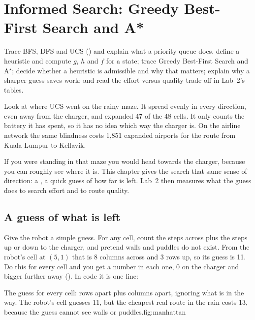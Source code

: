 \chapter{Informed Search: Greedy Best-First Search and A*}
\label{ch:informed}

\chapterguide%
  {Trace BFS, DFS and UCS () and explain what a priority queue does.}
  {define a heuristic and compute $g$, $h$ and $f$ for a state; trace Greedy Best-First Search and A$^\star$; decide whether a heuristic is admissible and why that matters; explain why a sharper guess saves work; and read the effort-versus-quality trade-off in Lab~2's tables.}

Look at where UCS went on the rainy maze. It spread evenly in every direction, even away from the charger, and expanded 47 of the 48 cells. It only counts the battery it has spent, so it has no idea which way the charger is. On the airline network the same blindness costs 1,851 expanded airports for the route from Kuala Lumpur to Keflav\'ik.

If you were standing in that maze you would head towards the charger, because you can roughly see where it is. This chapter gives the search that same sense of direction: a , a quick guess of how far is left. Lab~2 then measures what the guess does to search effort and to route quality.

\section{A guess of what is left}

Give the robot a simple guess. For any cell, count the steps across plus the steps up or down to the charger, and pretend walls and puddles do not exist. From the robot's cell at $(5,1)$ that is 8 columns across and 3 rows up, so its guess is 11. Do this for every cell and you get a number in each one, 0 on the charger and bigger further away (). In code it is one line:



\begin{utpfig}{The guess for every cell: rows apart plus columns apart, ignoring what is in the way. The robot's cell guesses 11, but the cheapest real route in the rain costs 13, because the guess cannot see walls or puddles.}{fig:manhattan}
\end{utpfig}

